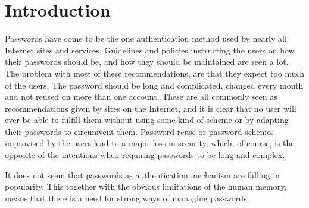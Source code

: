 \chapter{Introduction}
\label{chp:intro} 

Passwords have come to be the one authentication method used by nearly all Internet sites and services. Guidelines and policies instructing the users on how their passwords should be, and how they should be maintained are seen a lot. The problem with most of these recommendations, are that they expect too much of the users. The password should be long and complicated, changed every month and not reused on more than one account. These are all commonly seen as recommendations given by sites on the Internet, and it is clear that no user will ever be able to fulfill them without using some kind of scheme or by adapting their passwords to circumvent them. Password reuse or password schemes improvised by the users lead to a major loss in security, which, of course, is the opposite of the intentions when requiring passwords to be long and complex.  
\par It does not seem that passwords as authentication mechanism are falling in popularity. This together with the obvious limitations of the human memory, means that there is a need for strong ways of managing passwords. 


